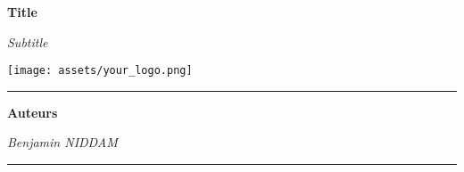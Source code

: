 \begin{titlepage}
    \begin{center}
        \vspace*{\fill}

        \textbf{\huge{Title}}\\

        \vspace{0.5cm}

        \textsl{\large{Subtitle}}\\

        \vspace{2.5cm}

        \texttt{[image: assets/your\_logo.png]}

        \vspace{2.5cm}

        \rule{\linewidth}{0.15mm}
        \textbf{Auteurs}

        \vspace{0.5cm}

        \small{\textit{Benjamin NIDDAM}} \\
        \rule{\linewidth}{0.15mm}

        \vspace{2.5cm}

        \vfill
        \date{\today}
    \end{center}
    \vspace*{\fill}
\end{titlepage}